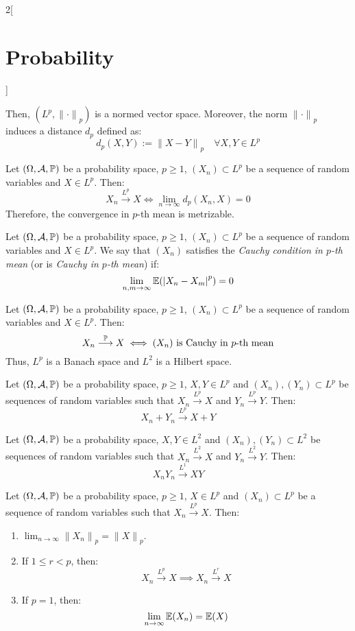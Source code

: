 \documentclass[../../../main.tex]{subfiles}
\begin{document}
\begin{multicols}{2}[\section{Probability}]
\begin{prop}
$$        $$
        Then, $(L^p,{\|\cdot\|}_p)$ is a normed vector space. Moreover, the norm ${\|\cdot\|}_p$ induces a distance $d_p$ defined as:
        $$d_p(X,Y):={\|X-Y\|}_p\quad\forall X,Y\in L^p$$
    \end{prop}
    \begin{prop}
        Let $(\Omega,\mathcal{A},\mathbb{P})$ be a probability space, $p\geq 1$, $(X_n)\subset L^p$ be a sequence of random variables and $X\in L^p$. Then:
        $$X_n\overset{L^p}{\longrightarrow} X\iff\lim_{n\to\infty}d_p(X_n,X)=0$$
        Therefore, the convergence in $p$-th mean is metrizable.
    \end{prop}
    \begin{definition}
        Let $(\Omega,\mathcal{A},\mathbb{P})$ be a probability space, $p\geq 1$, $(X_n)\subset L^p$ be a sequence of random variables and $X\in L^p$. We say that $(X_n)$ satisfies the \textit{Cauchy condition in $p$-th mean} (or is \textit{Cauchy in $p$-th mean}) if: $$\lim_{n,m\to\infty}\mathbb{E}({|X_n-X_m|}^p)=0$$
    \end{definition}
    \begin{prop}
        Let $(\Omega,\mathcal{A},\mathbb{P})$ be a probability space, $p\geq 1$, $(X_n)\subset L^p$ be a sequence of random variables and $X\in L^p$. Then:
        $$X_n\overset{\mathbb{P}}{\longrightarrow} X\iff(X_n)\text{ is Cauchy in $p$-th mean}$$
        Thus, $L^p$ is a Banach space and $L^2$ is a Hilbert space.
    \end{prop}
    \begin{prop}
        Let $(\Omega,\mathcal{A},\mathbb{P})$ be a probability space, $p\geq 1$, $X,Y\in L^p$ and $(X_n),(Y_n)\subset L^p$ be sequences of random variables such that $X_n\overset{L^p}{\longrightarrow} X$ and $Y_n\overset{L^p}{\longrightarrow} Y$. Then: $$X_n+Y_n\overset{L^p}{\longrightarrow} X+Y$$
    \end{prop}
    \begin{prop}
        Let $(\Omega,\mathcal{A},\mathbb{P})$ be a probability space, $X,Y\in L^2$ and $(X_n),(Y_n)\subset L^2$ be sequences of random variables such that $X_n\overset{L^2}{\longrightarrow} X$ and $Y_n\overset{L^2}{\longrightarrow} Y$. Then: $$X_nY_n\overset{L^1}{\longrightarrow} XY$$
    \end{prop}
    \begin{prop}
        Let $(\Omega,\mathcal{A},\mathbb{P})$ be a probability space, $p\geq 1$, $X\in L^p$ and $(X_n)\subset L^p$ be a sequence of random variables such that $X_n\overset{L^p}{\longrightarrow} X$. Then:
        \begin{enumerate}
            \item $\displaystyle\lim_{n\to\infty}{\|X_n\|}_p={\|X\|}_p$.
            \item If $1\leq r< p$, then: $$X_n\overset{L^p}{\longrightarrow} X\implies X_n\overset{L^r}{\longrightarrow} X$$
            \item If $p=1$, then: $$\lim_{n\to\infty}\mathbb{E}(X_n)=\mathbb{E}(X)$$
        \end{enumerate}
    \end{prop}

\end{multicols}
\end{document}

